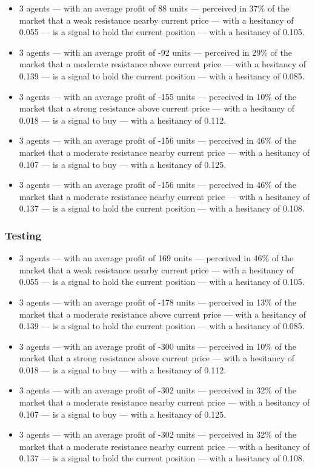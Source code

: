 {\small
  \begin{itemize}
  \item 3 agents — with an average profit of 88 units — perceived in 37\% of the
    market that a weak resistance nearby current price — with a hesitancy of
    0.055 — is a signal to hold the current position — with a hesitancy of
    0.105.
  \item 3 agents — with an average profit of -92 units — perceived in 29\% of
    the market that a moderate resistance above current price — with a hesitancy
    of 0.139 — is a signal to hold the current position — with a hesitancy of
    0.085.
  \item 3 agents — with an average profit of -155 units — perceived in 10\% of
    the market that a strong resistance above current price — with a hesitancy
    of 0.018 — is a signal to buy — with a hesitancy of 0.112.
  \item 3 agents — with an average profit of -156 units — perceived in 46\% of
    the market that a moderate resistance nearby current price — with a
    hesitancy of 0.107 — is a signal to buy — with a hesitancy of 0.125.
  \item 3 agents — with an average profit of -156 units — perceived in 46\% of
    the market that a moderate resistance nearby current price — with a
    hesitancy of 0.137 — is a signal to hold the current position — with a
    hesitancy of 0.108.
  \end{itemize}
}

\subsubsection{Testing}
\label{}

{\small
  \begin{itemize}
  \item 3 agents — with an average profit of 169 units — perceived in 46\% of
    the market that a weak resistance nearby current price — with a hesitancy of
    0.055 — is a signal to hold the current position — with a hesitancy of
    0.105.
  \item 3 agents — with an average profit of -178 units — perceived in 13\% of
    the market that a moderate resistance above current price — with a hesitancy
    of 0.139 — is a signal to hold the current position — with a hesitancy of
    0.085.
  \item 3 agents — with an average profit of -300 units — perceived in 10\% of
    the market that a strong resistance above current price — with a hesitancy
    of 0.018 — is a signal to buy — with a hesitancy of 0.112.
  \item 3 agents — with an average profit of -302 units — perceived in 32\% of
    the market that a moderate resistance nearby current price — with a
    hesitancy of 0.107 — is a signal to buy — with a hesitancy of 0.125.
  \item 3 agents — with an average profit of -302 units — perceived in 32\% of
    the market that a moderate resistance nearby current price — with a
    hesitancy of 0.137 — is a signal to hold the current position — with a
    hesitancy of 0.108.
  \end{itemize}
}

